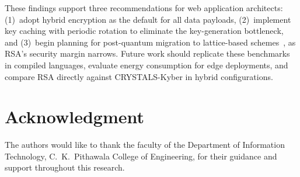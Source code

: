 \documentclass[journal]{IEEEtran}
\begin{document}
These findings support three recommendations for web application architects: (1)~adopt hybrid encryption as the default for all data payloads, (2)~implement key caching with periodic rotation to eliminate the key-generation bottleneck, and (3)~begin planning for post-quantum migration to lattice-based schemes~\cite{kyber2023}, \cite{dilithium2022} as RSA's security margin narrows. Future work should replicate these benchmarks in compiled languages, evaluate energy consumption for edge deployments, and compare RSA directly against CRYSTALS-Kyber in hybrid configurations.


\section*{Acknowledgment}

The authors would like to thank the faculty of the Department of Information Technology, C.~K.~Pithawala College of Engineering, for their guidance and support throughout this research.


\ifCLASSOPTIONcaptionsoff
\newpage
\fi
\end{document}
